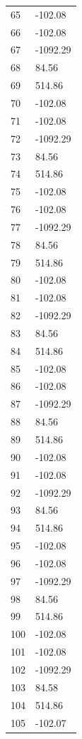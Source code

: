 \documentclass[a4paper,11pt]{article}
\begin{document}
\begin{center}
\begin{longtable}{|R{1.5cm}|R{2.5cm}|}
   65 &      -102.08 \\
   66 &      -102.08 \\
   67 &     -1092.29 \\
   68 &        84.56 \\
   69 &       514.86 \\
   70 &      -102.08 \\
   71 &      -102.08 \\
   72 &     -1092.29 \\
   73 &        84.56 \\
   74 &       514.86 \\
   75 &      -102.08 \\
   76 &      -102.08 \\
   77 &     -1092.29 \\
   78 &        84.56 \\
   79 &       514.86 \\
   80 &      -102.08 \\
   81 &      -102.08 \\
   82 &     -1092.29 \\
   83 &        84.56 \\
   84 &       514.86 \\
   85 &      -102.08 \\
   86 &      -102.08 \\
   87 &     -1092.29 \\
   88 &        84.56 \\
   89 &       514.86 \\
   90 &      -102.08 \\
   91 &      -102.08 \\
   92 &     -1092.29 \\
   93 &        84.56 \\
   94 &       514.86 \\
   95 &      -102.08 \\
   96 &      -102.08 \\
   97 &     -1092.29 \\
   98 &        84.56 \\
   99 &       514.86 \\
  100 &      -102.08 \\
  101 &      -102.08 \\
  102 &     -1092.29 \\
  103 &        84.58 \\
  104 &       514.86 \\
  105 &      -102.07 \\

\end{longtable}
\end{center}
\end{document}
